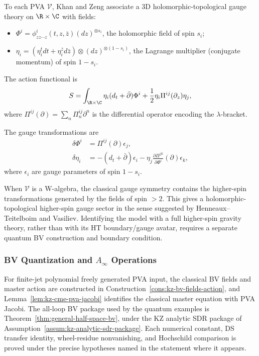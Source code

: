 \begin{construction}
To each PVA $\mathcal{V}$, Khan and Zeng associate a 3D holomorphic-topological gauge theory on $\R \times \C$ with fields:
\begin{itemize}
\item $\Phi^i = \phi^i_{zz\cdots z}(t,z,\bar{z})(dz)^{\otimes s_i}$, the holomorphic field of spin $s_i$;
\item $\eta_i = (\eta_i^t dt + \eta_i^{\bar{z}} d\bar{z}) \otimes (dz)^{\otimes(1-s_i)}$, the Lagrange multiplier (conjugate momentum) of spin $1-s_i$.
\end{itemize}
The action functional is
\begin{equation}
S = \int_{\R \times \C} \eta_i (d_t + \bar{\partial})\Phi^i + \frac{1}{2} \eta_i \Pi^{ij}(\partial_z) \eta_j,
\end{equation}
where $\Pi^{ij}(\partial) = \sum_n \Pi^{ij}_n \partial^n$ is the differential operator encoding the $\lambda$-bracket.

The gauge transformations are
\begin{align}
\delta \Phi^i &= \Pi^{ij}(\partial) \epsilon_j,\\
\delta \eta_i &= -(d_t + \bar{\partial})\epsilon_i - \eta_j \frac{\partial \Pi^{jk}}{\partial \Phi^i}(\partial) \epsilon_k,
\end{align}
where $\epsilon_i$ are gauge parameters of spin $1-s_i$.
\end{construction}

\begin{remark}
When $\mathcal{V}$ is a W-algebra, the classical gauge symmetry contains
the higher-spin transformations generated by the fields of spin $>2$.
This gives a holomorphic-topological higher-spin gauge sector in the
sense suggested by Henneaux--Teitelboim and Vasiliev. Identifying the
model with a full higher-spin gravity theory, rather than with its HT
boundary/gauge avatar, requires a separate quantum BV construction and
boundary condition.
\end{remark}

\subsubsection{BV Quantization and $A_\infty$ Operations}

\begin{remark}
For finite-jet polynomial freely generated PVA input, the classical BV
fields and master action are constructed in
Construction~\ref{cons:kz-bv-fields-action}, and
Lemma~\ref{lem:kz-cme-pva-jacobi} identifies the classical master
equation with PVA Jacobi. The all-loop BV package used by the quantum
examples is Theorem~\ref{thm:general-half-space-bv}, under the
KZ analytic SDR package of Assumption~\ref{assum:kz-analytic-sdr-package}.
Each numerical constant, DS transfer identity, wheel-residue
nonvanishing, and Hochschild comparison is proved under the precise
hypotheses named in the statement where it appears.
\end{remark}

